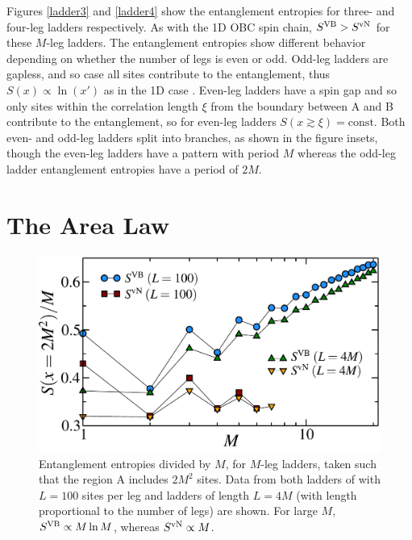  Figures \ref{ladder3} and \ref{ladder4} show the entanglement entropies for three- and four-leg ladders respectively.
 As with the 1D OBC spin chain, $S^{\text{VB}} > S^{\text{vN}}$ for these $M$-leg ladders.
 The entanglement entropies show different behavior depending on whether the number of legs is even or odd.
 Odd-leg ladders are gapless, and so case all sites contribute to the entanglement, thus
 $S(x) \propto \ln(x')$ as in the 1D case \cite{White1994}.
 Even-leg ladders have a spin gap and so only sites within the correlation length $\xi$ from the boundary between A and B contribute to the entanglement,
so for even-leg ladders $S(x\gtrsim\xi) = \text{const}$. 
Both even- and odd-leg ladders split into branches, as shown in the figure insets, though the even-leg ladders have a pattern with period $M$ whereas the odd-leg ladder entanglement entropies have a period of $2M$.  
 
\section{The Area Law}
\label{vbAlaw}

\begin{figure} { \includegraphics[width=6in]{./figures/paper1/figure4/4fig.pdf}
 \caption[Area Law in 2D Heis model]{
Entanglement entropies divided by $M$,  for $M$-leg ladders, taken such that
the region A includes $2M^2$ sites.  
Data from both ladders of  with $L=100$ sites per leg and ladders of length $L=4M$ 
(with length proportional to the number of legs) are shown.
For large $M$, $S^{\rm VB}\propto M \ln M$,
whereas $S^{\rm vN}\propto M$.   
\label{zigzag}}} 
\end{figure}

